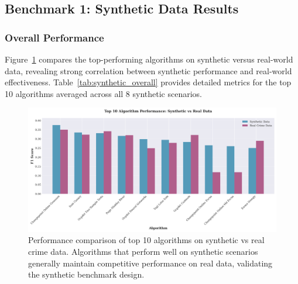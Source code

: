 \documentclass[journal,article,submit,pdftex,moreauthors]{Definitions/mdpi}
\begin{document}
\subsection{Benchmark 1: Synthetic Data Results}
\label{sec:results_synthetic}

\subsubsection{Overall Performance}

Figure~\ref{fig:top_algorithms} compares the top-performing algorithms on synthetic versus real-world data, revealing strong correlation between synthetic performance and real-world effectiveness. Table~\ref{tab:synthetic_overall} provides detailed metrics for the top 10 algorithms averaged across all 8 synthetic scenarios.

\begin{figure}[ht]
\centering
\includegraphics[width=\textwidth]{figures/fig_top_algorithms_comparison.png}
\caption{Performance comparison of top 10 algorithms on synthetic vs real crime data. Algorithms that perform well on synthetic scenarios generally maintain competitive performance on real data, validating the synthetic benchmark design.}
\label{fig:top_algorithms}
\end{figure}
\end{document}
